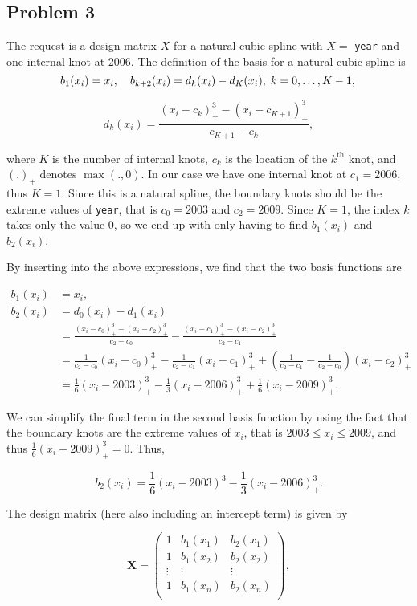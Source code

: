 \documentclass[
]{article}
\begin{document}
\subsection{Problem 3}\label{problem-3}

The request is a design matrix \(X\) for a natural cubic spline with
\(X =\) \texttt{year} and one internal knot at \(2006\). The definition
of the basis for a natural cubic spline is \[
b_1(x_i) = x_i, \quad b_{k+2}(x_i) = d_k(x_i)-d_K(x_i),\; k = 0, \ldots, K - 1,\\
\]

\[
d_k(x_i) = \frac{(x_i-c_k)^3_+-(x_i-c_{K+1})^3_+}{c_{K+1}-c_k},
\]

where \(K\) is the number of internal knots, \(c_k\) is the location of
the \(k^\text{th}\) knot, and \((.)_+\) denotes \(\max (., 0)\). In our
case we have one internal knot at \(c_1 = 2006\), thus \(K = 1\). Since
this is a natural spline, the boundary knots should be the extreme
values of \texttt{year}, that is \(c_0 = 2003\) and \(c_2 = 2009\).
Since \(K=1\), the index \(k\) takes only the value \(0\), so we end up
with only having to find \(b_1(x_i)\) and \(b_2(x_i)\).

By inserting into the above expressions, we find that the two basis
functions are

\begin{align*}
b_1(x_i) &= x_i,\\
b_2(x_i) &= d_0(x_i)-d_1(x_i)\\
&= \frac{(x_i-c_0)^3_+-(x_i-c_2)^3_+}{c_2-c_0} - \frac{(x_i-c_1)^3_+-(x_i-c_2)^3_+}{c_2-c_1}\\
&= \frac{1}{c_2-c_0}(x_i-c_0)^3_+ - \frac{1}{c_2-c_1}(x_i-c_1)^3_+ + \left(\frac{1}{c_2-c_1}-\frac{1}{c_2-c_0}\right)(x_i-c_{2})^3_+\\
&= \frac{1}{6}(x_i-2003)^3_+ - \frac{1}{3}(x_i-2006)^3_+ + \frac{1}{6}(x_i-2009)^3_+.
\end{align*}

We can simplify the final term in the second basis function by using the
fact that the boundary knots are the extreme values of \(x_i\), that is
\(2003 \leq x_i \leq 2009\), and thus \(\frac{1}{6}(x_i-2009)^3_+=0\).
Thus,

\[
b_2(x_i) = \frac{1}{6}(x_i-2003)^3 - \frac{1}{3}(x_i-2006)^3_+.
\]

The design matrix (here also including an intercept term) is given by

\[
\mathbf X = \begin{pmatrix}
1 & b_{1}(x_1) & b_{2}(x_1) \\
1 & b_{1}(x_2) & b_{2}(x_2) \\
\vdots & \vdots & \vdots \\
1 & b_{1}(x_n) & b_{2}(x_n) \\
\end{pmatrix},
\]
\end{document}

